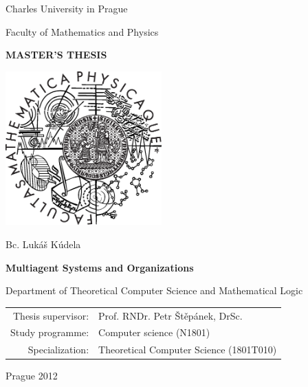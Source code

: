 
\begin{titlepage}
\begin{center}

\large
Charles University in Prague

\medskip

Faculty of Mathematics and Physics

\vfill

{\Large \textbf{MASTER'S THESIS}}

\vfill

\includegraphics[width=60mm]{images/mff_logo.eps}

\vfill
\vspace{5mm}

{\LARGE Bc. Lukáš Kúdela}

\vspace{15mm}

{\LARGE \textbf{Multiagent Systems and Organizations}}

\vfill

Department of Theoretical Computer Science and Mathematical Logic

\vfill

\begin{tabular}{rl}
Thesis supervisor: & Prof. RNDr. Petr Štěpánek, DrSc.\\
\noalign{\vspace{2mm}}
Study programme: & Computer science (N1801)\\
\noalign{\vspace{2mm}}
Specialization: & Theoretical Computer Science (1801T010)\\
\end{tabular}

\vfill

Prague 2012

\end{center}
\end{titlepage}